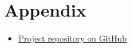 \section{Appendix}

\begin{itemize}
    \item \href{https://github.com/njavet/mars}{Project repository on GitHub}
\end{itemize}

